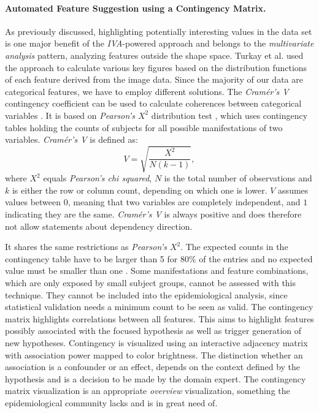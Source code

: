 \documentclass[journal]{style/vgtc} 			          %
\begin{document}
\paragraph{Automated Feature Suggestion using a Contingency Matrix.}
As previously discussed, highlighting potentially interesting values in the data set is one major benefit of the \emph{IVA}-powered approach and belongs to the \emph{multivariate analysis} pattern,  analyzing features outside the shape space.
%
Turkay et al. \cite{Turkay2013} used the approach to calculate various key figures based on the distribution functions of each feature derived from the image data.
%
Since the majority of our data are categorical features, we have to employ different solutions.
%
The \emph{Cram\'{e}r's V} contingency coefficient can be used to calculate coherences between categorical variables \cite{CramerV}.
%
It is based on \emph{Pearson's $X^2$} distribution test \cite{ChiSquare}, which uses contingency tables holding the counts of subjects for all possible manifestations of two variables.
%
\emph{Cram\'{e}r's V} is defined as:
\begin{equation}
V = \sqrt{\frac{X^2}{N(k-1)}},
\end{equation}
where $X^2$ equals \emph{Pearson's chi squared}, $N$ is the total number of observations and $k$ is either the row or column count, depending on which one is lower.
%
$V$ assumes values between $0$, meaning that two variables are completely independent, and $1$ indicating they are the same.
%
\emph{Cram\'{e}r's V} is always positive and does therefore not allow statements about dependency direction.

It shares the same restrictions as \emph{Pearson's $X^2$}.
%
The expected counts in the contingency table have to be larger than 5 for $80\%$ of the entries and no expected value must be smaller than one \cite{Cochran1952}.
%
Some manifestations and feature combinations, which are only exposed by small subject groups, cannot be assessed with this technique.
%
They cannot be included into the epidemiological analysis, since statistical validation needs a minimum count to be seen as valid.
%
The contingency matrix highlights correlations between all features. %
%
This aims to highlight features possibly associated with the focused hypothesis as well as trigger generation of new hypotheses.
%
Contingency is visualized using an interactive adjacency matrix with association power mapped to color brightness.
%
The distinction whether an association is a confounder or an effect, depends on the context defined by the hypothesis and is a decision to be made by the domain expert.
%
The contingency matrix visualization is an appropriate \emph{overview} visualization, something the epidemiological community lacks and is in great need of.
\end{document}
